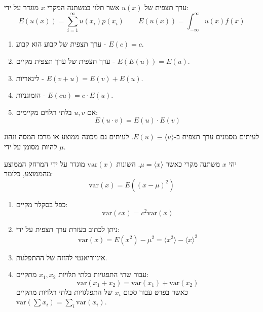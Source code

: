 \documentclass{tstextbook}
\begin{document}
\begin{definition}
ערך תצפית של \(u(x)\) אשר תלוי במשתנה המקרי \(x\) מוגדר על ידי:
$$E(u(x))=\sum_{i=1}^{\infty}u(x_{i})p(x_{i})\qquad E(u(x))=\int_{-\infty}^{\infty}u(x)f(x)$$

\end{definition}
\begin{corollary}
  \begin{enumerate}
    \item ערך תצפית של קבוע הוא קבוע - \(E(c)=c\). 


    \item ערך תצפית של ערך תצפית מקיים - \(E(E(u))=E(u)\). 


    \item לינאריות - \(E(v+u)=E(v)+E(u)\). 


    \item הומוגניות - \(E(cu)=c\cdot E(u)\). 


    \item אם \(u,v\) בלתי תלוים מקיימים: 
$$E\left( u\cdot v \right)=E(u)\cdot E(v)$$


  \end{enumerate}
\end{corollary}
\begin{symbolize}
לעיתים מסמנים ערך תצפית ב-\(E(u)\equiv \langle u \rangle\). לעיתים גם מכונה ממוצע או מרכז המסה ונהוג להיות מסומן על ידי \(\mu\).

\end{symbolize}
\begin{definition}[שונות]
יהי \(x\) משתנה מקרי כאשר \(\mu=\langle x \rangle\). השונות \(\mathrm{var}(x)\) מוגדר על ידי המרחק הממוצע מהממוצע, כלומר:
$$\mathrm{var}(x)=E\left( \left( x-\mu \right)^{2} \right)$$

\end{definition}
\begin{proposition}
  \begin{enumerate}
    \item כפל בסקלר מקיים: 
$$\mathrm{var}(cx)=c^{2}\mathrm{var}(x)$$


    \item ניתן לכתוב בעזרת ערך תצפית על ידי: 
$$\mathrm{var}(x)=E(x^{2})-\mu^{2}=\langle x^{2} \rangle -\langle x \rangle ^{2}$$


    \item אינווריאנטי להזזה של ההתפלגות. 


    \item עבור שתי התפגויות בלתי תלויות \(x_{1},x_{2}\) מתקיים: 
$$\mathrm{var}(x_{1}+x_{2})=\mathrm{var}(x_{1})+\mathrm{var}(x_{2})$$
כאשר בפרט עבור סכום \(x_{i}\) של התפלגויות בלתי תלויות מתקיים \(\mathrm{var}\left( \sum x_{i} \right)=\sum_{i}\mathrm{var}(x_{i})\).


  \end{enumerate}
\end{proposition}
\end{document}
